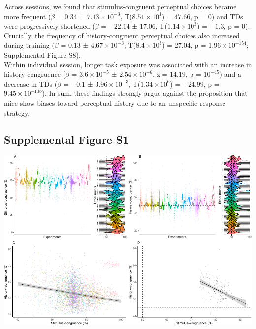 \documentclass[
]{article}
\begin{document}
Across sessions, we found that stimulus-congruent perceptual choices
became more frequent (\(\beta\) = \(0.34\) ±
\(\ensuremath{7.13\times 10^{-3}}\),
T(\(\ensuremath{8.51\times 10^{3}}\)) = \(47.66\), p = \(0\)) and TDs
were progressively shortened (\(\beta\) = \(-22.14\) ± \(17.06\),
T(\(\ensuremath{1.14\times 10^{3}}\)) = \(-1.3\), p = \(0\)). Crucially,
the frequency of history-congruent perceptual choices also increased
during training (\(\beta\) = \(0.13\) ±
\(\ensuremath{4.67\times 10^{-3}}\),
T(\(\ensuremath{8.4\times 10^{3}}\)) = \(27.04\), p =
\(\ensuremath{1.96\times 10^{-154}}\); Supplemental Figure S8).\\
Within individual session, longer task exposure was associated with an
increase in history-congruence (\(\beta\) =
\(\ensuremath{3.6\times 10^{-5}}\) ±
\(\ensuremath{2.54\times 10^{-6}}\), z = \(14.19\), p =
\(\ensuremath{10^{-45}}\)) and a decrease in TDs (\(\beta\) = \(-0.1\) ±
\(\ensuremath{3.96\times 10^{-3}}\),
T(\(\ensuremath{1.34\times 10^{6}}\)) = \(-24.99\), p =
\(\ensuremath{9.45\times 10^{-138}}\)). In sum, these findings strongly
argue against the proposition that mice show biases toward perceptual
history due to an unspecific response strategy.

\newpage

\hypertarget{supplemental-figure-s1}{%
\subsection{Supplemental Figure S1}\label{supplemental-figure-s1}}

\includegraphics{modes_mouse_rev2_files/figure-latex/Supplemental_Figure_S1-1.pdf}
\end{document}
